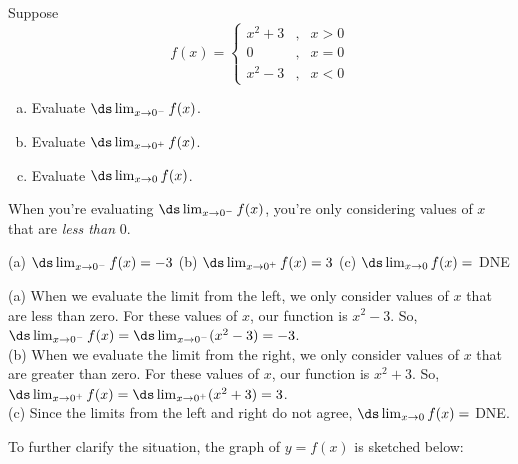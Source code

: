 \begin{question}
Suppose
\[f(x)=\left\{\begin{array}{lcc}
x^2+3&,&x>0\\
0&,&x=0\\
x^2-3&,&x<0
\end{array}\right.\]
\begin{enumerate}[(a)]
\item Evaluate $\ds\lim_{x \to 0^-} f(x)$.
\item Evaluate $\ds\lim_{x \to 0^+} f(x)$.
\item Evaluate $\ds\lim_{x \to 0} f(x)$.
\end{enumerate}
\end{question}
\begin{hint}
When you're evaluating $\ds\lim_{x \to 0^-}f(x)$, you're only considering values of $x$ that are \emph{less than} 0.
\end{hint}
\begin{answer}
(a) $\ds\lim_{x \to 0^-} f(x)=-3$
\qquad
(b) $\ds\lim_{x \to 0^+} f(x)=3$
\qquad
(c) $\ds\lim_{x \to 0} f(x)=$ DNE
\end{answer}
\begin{solution}
(a) When we evaluate the limit from the left, we only consider values of $x$ that are less than zero. For these values of $x$, our function is $x^2-3$. So, $\ds\lim_{x \to 0^-} f(x)=\ds\lim_{x \to 0^-} (x^2-3)=-3$.
\\
(b) When we evaluate the limit from the right, we only consider values of $x$ that are greater than zero. For these values of $x$, our function is $x^2+3$. So, $\ds\lim_{x \to 0^+} f(x)=\ds\lim_{x \to 0^+} (x^2+3)=3$.
\\
(c) Since the limits from the left and right do not agree, $\ds\lim_{x \to 0} f(x)=$ DNE.

To further clarify the situation, the graph of $y=f(x)$ is sketched below:
\begin{center}
\end{center}
\end{solution}


